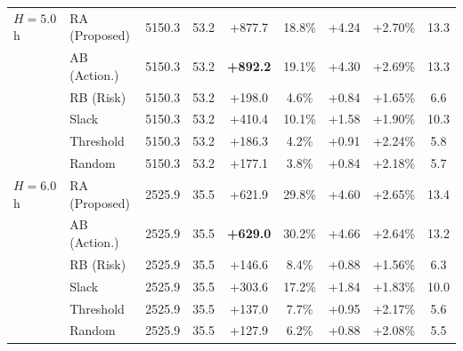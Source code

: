 \documentclass[11pt,a4paper]{article}
\begin{document}
\begin{table}[htbp]
\begin{tabular}{llccccccc}
\midrule
$H = 5.0$h & RA (Proposed) & 5150.3 & 53.2 & +877.7 & 18.8\% & +4.24 & +2.70\% & 13.3 \\
           & AB (Action.)  & 5150.3 & 53.2 & \textbf{+892.2} & 19.1\% & +4.30 & +2.69\% & 13.3 \\
           & RB (Risk)     & 5150.3 & 53.2 & +198.0  & 4.6\% & +0.84 & +1.65\% & 6.6 \\
           & Slack         & 5150.3 & 53.2 & +410.4  & 10.1\% & +1.58 & +1.90\% & 10.3 \\
           & Threshold     & 5150.3 & 53.2 & +186.3  & 4.2\% & +0.91 & +2.24\% & 5.8 \\
           & Random        & 5150.3 & 53.2 & +177.1  & 3.8\% & +0.84 & +2.18\% & 5.7 \\
\midrule
$H = 6.0$h & RA (Proposed) & 2525.9 & 35.5 & +621.9 & 29.8\% & +4.60 & +2.65\% & 13.4 \\
           & AB (Action.)  & 2525.9 & 35.5 & \textbf{+629.0} & 30.2\% & +4.66 & +2.64\% & 13.2 \\
           & RB (Risk)     & 2525.9 & 35.5 & +146.6  & 8.4\% & +0.88 & +1.56\% & 6.3 \\
           & Slack         & 2525.9 & 35.5 & +303.6  & 17.2\% & +1.84 & +1.83\% & 10.0 \\
           & Threshold     & 2525.9 & 35.5 & +137.0  & 7.7\% & +0.95 & +2.17\% & 5.6 \\
           & Random        & 2525.9 & 35.5 & +127.9  & 6.2\% & +0.88 & +2.08\% & 5.5 \\
\bottomrule
\end{tabular}
\end{table}
\end{document}
